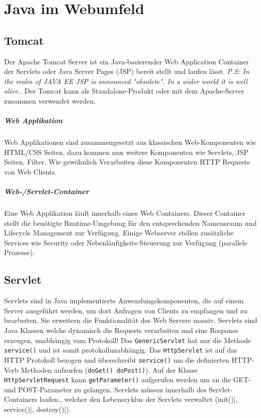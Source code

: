 \chapter{Java im Webumfeld}

\section{Tomcat}
Der Apache Tomcat Server ist ein Java-basierender Web Application Container der Servlets oder Java Server Pages (JSP) bereit stellt und laufen lässt. \emph{P.S: In the realm of JAVA EE JSP is announced "obsolete". In a wider world it is well alive.}. Der Tomcat kann als Standalone-Produkt oder mit dem Apache-Server zusammen verwendet werden.

\paragraph{Web Applikation}
Web Applikationen sind zusammengesetzt aus klassischen Web-Komponenten wie HTML/CSS Seiten, dazu kommen nun weitere Komponenten wie Servlets, JSP Seiten, Filter. Wie gewöhnlich Verarbeiten diese Komponenten HTTP Requests von Web Clients.

\paragraph{Web-/Servlet-Container}
Eine Web Applikation läuft innerhalb eines Web Containers. Dieser Container stellt die benötigte Runtime-Umgebung für den entsprechenden Namensraum und Lifecycle Management zur Verfügung. Einige Webserver stellen zusätzliche Services wie Security oder Nebenläufigkeits-Steuerung zur Verfügung (parallele Prozesse).

\section{Servlet}
Servlets sind in Java implementierte Anwendungskomponenten, die auf einem Server ausgeführt werden, um dort Anfragen von Clients zu empfangen und zu bearbeiten. Sie erweitern die Funktionalität des Web Servers massiv. Servlets sind Java Klassen welche dynamisch die Requests verarbeiten und eine Response erzeugen, unabhängig vom Protokoll! Das \verb|GenericServlet| hat nur die Methode \verb|service()| und ist somit protokollunabhängig. Das \verb|HttpServlet| ist auf das HTTP Protokoll bezogen und überschreibt \verb|service()| um die definierten HTTP-Verb Methoden aufzurfen (\verb|doGet() doPost()|). Auf der Klasse \verb|HttpServletRequest| kann \verb|getParameter()| aufgerufen werden um an die GET- und POST-Parameter zu gelangen. Servlets müssen innerhalb des Servlet-Containers laufen., welcher den Lebenszyklus der Servlets verwaltet (\verb||init()|, \verb||service()|, \verb||destroy()|).

